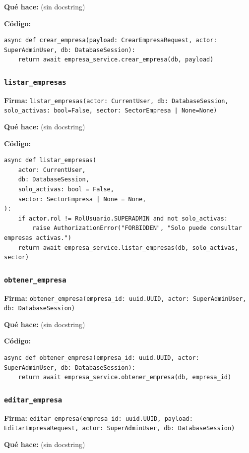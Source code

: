 \documentclass[11pt,a4paper]{article}
\begin{document}
\textbf{Qué hace:} (sin docstring)

\textbf{Código:}
\begin{lstlisting}
async def crear_empresa(payload: CrearEmpresaRequest, actor: SuperAdminUser, db: DatabaseSession):
    return await empresa_service.crear_empresa(db, payload)
\end{lstlisting}

\subsubsection*{\texttt{listar\_empresas}}
\textbf{Firma:} \texttt{listar\_empresas(actor: CurrentUser, db: DatabaseSession, solo\_activas: bool=False, sector: SectorEmpresa | None=None)}

\textbf{Qué hace:} (sin docstring)

\textbf{Código:}
\begin{lstlisting}
async def listar_empresas(
    actor: CurrentUser,
    db: DatabaseSession,
    solo_activas: bool = False,
    sector: SectorEmpresa | None = None,
):
    if actor.rol != RolUsuario.SUPERADMIN and not solo_activas:
        raise AuthorizationError("FORBIDDEN", "Solo puede consultar empresas activas.")
    return await empresa_service.listar_empresas(db, solo_activas, sector)
\end{lstlisting}

\subsubsection*{\texttt{obtener\_empresa}}
\textbf{Firma:} \texttt{obtener\_empresa(empresa\_id: uuid.UUID, actor: SuperAdminUser, db: DatabaseSession)}

\textbf{Qué hace:} (sin docstring)

\textbf{Código:}
\begin{lstlisting}
async def obtener_empresa(empresa_id: uuid.UUID, actor: SuperAdminUser, db: DatabaseSession):
    return await empresa_service.obtener_empresa(db, empresa_id)
\end{lstlisting}

\subsubsection*{\texttt{editar\_empresa}}
\textbf{Firma:} \texttt{editar\_empresa(empresa\_id: uuid.UUID, payload: EditarEmpresaRequest, actor: SuperAdminUser, db: DatabaseSession)}

\textbf{Qué hace:} (sin docstring)
\end{document}
